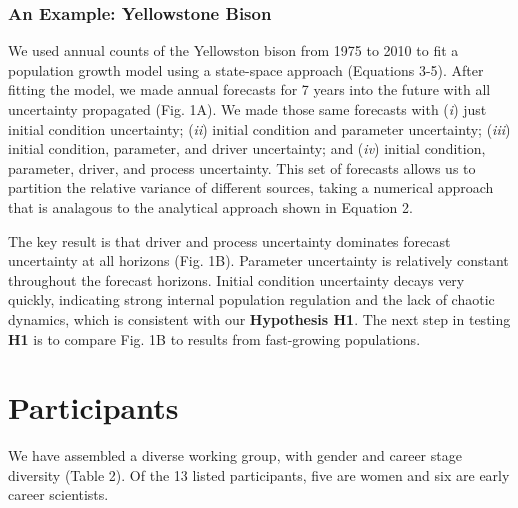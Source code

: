 \documentclass[12pt,]{article}
\begin{document}
\subsubsection{An Example: Yellowstone Bison}

We used annual counts of the Yellowston bison from 1975 to 2010 to fit a
population growth model using a state-space approach (Equations 3-5).
After fitting the model, we made annual forecasts for 7 years into the
future with all uncertainty propagated (Fig. 1A). We made those same
forecasts with (\emph{i}) just initial condition uncertainty;
(\emph{ii}) initial condition and parameter uncertainty; (\emph{iii})
initial condition, parameter, and driver uncertainty; and (\emph{iv})
initial condition, parameter, driver, and process uncertainty. This set
of forecasts allows us to partition the relative variance of different
sources, taking a numerical approach that is analagous to the analytical
approach shown in Equation 2.

The key result is that driver and process uncertainty dominates forecast
uncertainty at all horizons (Fig. 1B). Parameter uncertainty is
relatively constant throughout the forecast horizons. Initial condition
uncertainty decays very quickly, indicating strong internal population
regulation and the lack of chaotic dynamics, which is consistent with
our \textbf{Hypothesis H1}. The next step in testing \textbf{H1} is to
compare Fig. 1B to results from fast-growing populations.

\section{Participants}

We have assembled a diverse working group, with gender and career stage
diversity (Table 2). Of the 13 listed participants, five are women and
six are early career scientists.

\footnotesize
\end{document}

